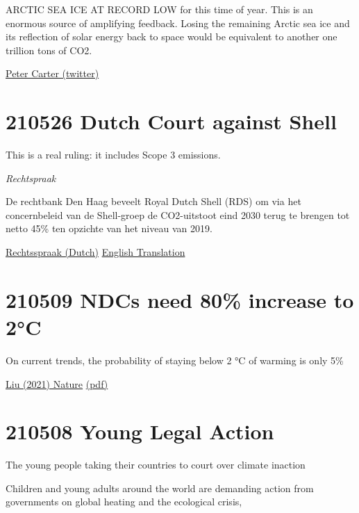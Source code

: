 \documentclass[
]{book}
\begin{document}
ARCTIC SEA ICE AT RECORD LOW for this time of year. This is an enormous source of amplifying feedback. Losing the remaining Arctic sea ice and its reflection of solar energy back to space would be equivalent to another one trillion tons of CO2.

\href{https://twitter.com/PCarterClimate/status/1416264975522295809/photo/1}{Peter Carter (twitter)}

\hypertarget{dutch-court-against-shell}{%
\section{210526 Dutch Court against Shell}\label{dutch-court-against-shell}}

This is a real ruling: it includes Scope 3 emissions.

\emph{Rechtspraak}

De rechtbank Den Haag beveelt Royal Dutch Shell (RDS) om via het concernbeleid van de Shell-groep de CO2-uitstoot eind 2030 terug te brengen tot netto 45\% ten opzichte van het niveau van 2019.

\href{https://www.rechtspraak.nl/Organisatie-en-contact/Organisatie/Rechtbanken/Rechtbank-Den-Haag/Nieuws/Paginas/Royal-Dutch-Shell-moet-CO2-uitstoot-terugbrengen.aspx}{Rechtsspraak (Dutch)}
\href{https://uitspraken.rechtspraak.nl/inziendocument?id=ECLI:NL:RBDHA:2021:5339\&showbutton=true\&keyword=shell}{English Translation}

\hypertarget{ndcs-need-80-increase-to-2c}{%
\section{210509 NDCs need 80\% increase to 2°C}\label{ndcs-need-80-increase-to-2c}}

On current trends, the probability of staying
below 2 °C of warming is only 5\%

\href{https://www.nature.com/articles/s43247-021-00097-8}{Liu (2021) Nature}
\href{pdf/Liu_2021_NDC_80pct_2C.pdf}{(pdf)}

\hypertarget{young-legal-action}{%
\section{210508 Young Legal Action}\label{young-legal-action}}

The young people taking their countries to court over climate inaction

Children and young adults around the world are demanding action from governments on global heating and the ecological crisis,
\end{document}
